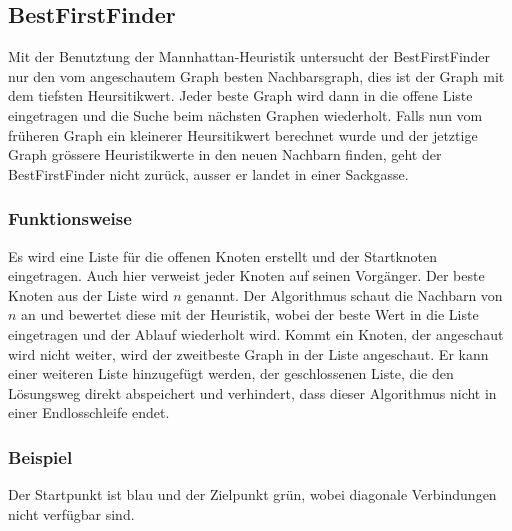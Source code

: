 \subsection{BestFirstFinder}

Mit der Benutztung der Mannhattan-Heuristik untersucht der BestFirstFinder 
nur den vom angeschautem Graph besten Nachbarsgraph, dies ist der Graph mit dem tiefsten
Heursitikwert. Jeder beste Graph wird dann in die offene Liste eingetragen und die Suche
beim nächsten Graphen wiederholt. Falls nun vom früheren Graph ein kleinerer Heursitikwert
berechnet wurde und der jetztige Graph grössere Heuristikwerte in den neuen Nachbarn finden,
geht der BestFirstFinder nicht zurück, ausser er landet in einer Sackgasse.

\subsubsection{Funktionsweise}

Es wird eine Liste für die offenen Knoten erstellt und der Startknoten 
eingetragen. Auch hier verweist jeder Knoten auf seinen Vorgänger.
Der beste Knoten aus der Liste wird $n$ genannt. Der Algorithmus schaut die Nachbarn von $n$
an und bewertet diese mit der Heuristik, wobei der beste Wert in die Liste
eingetragen und der Ablauf wiederholt wird. Kommt ein Knoten, der
angeschaut wird nicht weiter, wird der zweitbeste Graph in der Liste
angeschaut. Er kann einer weiteren Liste hinzugefügt werden, der
geschlossenen Liste, die den Lösungsweg direkt  abspeichert und
verhindert, dass dieser Algorithmus nicht in einer Endlosschleife endet.
\cite[Roblox Developer, 2018]{robdevbff}

\subsubsection{Beispiel}

Der Startpunkt ist blau und der Zielpunkt grün, wobei diagonale Verbindungen nicht verfügbar sind.

